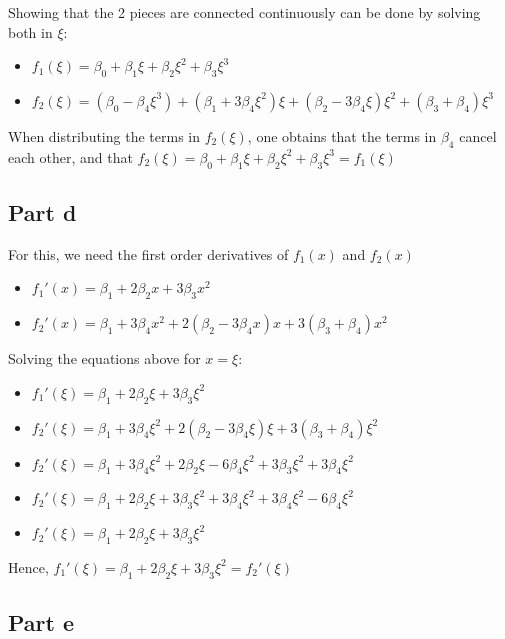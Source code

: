 \documentclass[11pt, a4paper]{article}
\begin{document}
Showing that the 2 pieces are connected continuously can be done by
solving both in $\xi$:

\begin{itemize}
\item $f_1(\xi)=\beta_0 + \beta_1 \xi + \beta_2 \xi^2 + \beta_3 \xi^3$
\item $f_2(\xi)=(\beta_0 - \beta_4 \xi^3) + (\beta_1 + 3 \beta_4 \xi^2) \xi  +(\beta_2 - 3 \beta_4 \xi) \xi^2 + (\beta_3 + \beta_4) \xi^3$
\end{itemize}

When distributing the terms in $f_2(\xi)$, one obtains that the terms
in $\beta_4$ cancel each other, and that $f_2(\xi)=\beta_0 + \beta_1 \xi + \beta_2 \xi^2 + \beta_3 \xi^3=f_1(\xi)$
\subsection{Part d}
\label{sec-1-4}

For this, we need the first order derivatives of $f_1(x)$ and $f_2(x)$
\begin{itemize}
\item $f_1'(x)=\beta_1 + 2\beta_2 x + 3\beta_3 x^2$
\item $f_2'(x)=\beta_1 + 3 \beta_4 x^2 + 2 (\beta_2 - 3 \beta_4 x) x + 3 (\beta_3 + \beta_4) x^2$
\end{itemize}

Solving the equations above for $x=\xi$:

\begin{itemize}
\item $f_1'(\xi)=\beta_1 + 2\beta_2 \xi + 3\beta_3 \xi^2$
\item $f_2'(\xi) = \beta_1 + 3\beta_4 \xi^2 + 2(\beta_2 - 3\beta_4 \xi) \xi + 3(\beta_3 + \beta_4) \xi^2$
\item $f_2'(\xi) = \beta_1 + 3\beta_4 \xi^2 + 2\beta_2 \xi - 6\beta_4 \xi^2 + 3\beta_3 \xi^2 + 3\beta_4 \xi^2$
\item $f_2'(\xi) = \beta_1 + 2\beta_2 \xi + 3\beta_3 \xi^2 + 3\beta_4 \xi^2 + 3\beta_4 \xi^2 - 6\beta_4 \xi^2$
\item $f_2'(\xi) = \beta_1 + 2\beta_2 \xi + 3\beta_3 \xi^2$
\end{itemize}

Hence, $f_1'(\xi)=\beta_1 + 2\beta_2 \xi + 3\beta_3 \xi^2=f_2'(\xi)$
\subsection{Part e}
\label{sec-1-5}
\end{document}
